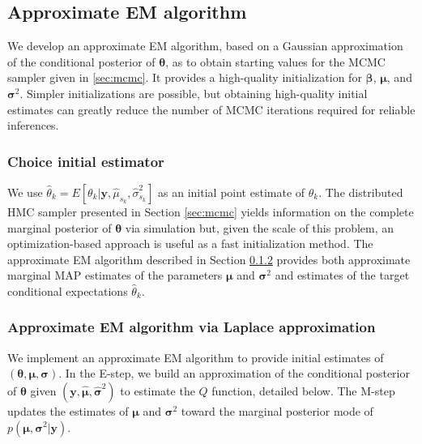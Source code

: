 \subsection{Approximate EM algorithm}
\label{sec:approxem}

We develop an approximate EM algorithm, based on a Gaussian approximation of the conditional posterior of $\bm \theta$, as to obtain starting values for the MCMC sampler given in \ref{sec:mcmc}.
It provides a high-quality initialization for $\bm \beta$, $\bm \mu$, and $\bm \sigma^2$.
Simpler initializations are possible, but obtaining high-quality initial estimates can greatly reduce the number of MCMC iterations required for reliable inferences.

\subsubsection{Choice initial estimator}
\label{sec:objective}

We use $\hat \theta_k = E \left[ \theta_k | \bm y, \hat \mu_{s_k}, \hat \sigma^2_{s_k} \right]$ as an initial point estimate of $\theta_k$.
The distributed HMC sampler presented in Section \ref{sec:mcmc} yields information on the complete marginal posterior of $\bm \theta$ via simulation but, given the scale of this problem, an optimization-based approach is useful as a fast initialization method.
The approximate EM algorithm described in Section \ref{sec:approximate_em} provides both approximate marginal MAP estimates of the parameters $\bm \mu$ and $\bm \sigma^2$ and estimates of the target conditional expectations $\hat \theta_k$.

\subsubsection{Approximate EM algorithm via Laplace approximation}
\label{sec:approximate_em}

We implement an approximate EM algorithm to provide initial estimates of $(\bm \theta, \bm \mu, \bm \sigma)$.
In the E-step, we build an approximation of the conditional posterior of ${\bm \theta}$ given $(\bm y, \hat {\bm\mu}, \hat{\bm\sigma}^2)$ to estimate the $Q$ function, detailed below.
The M-step updates the estimates of $\bm \mu$ and $\bm \sigma^2$ toward the marginal posterior mode of $p(\bm \mu, \bm \sigma^2 | \bm y)$.

